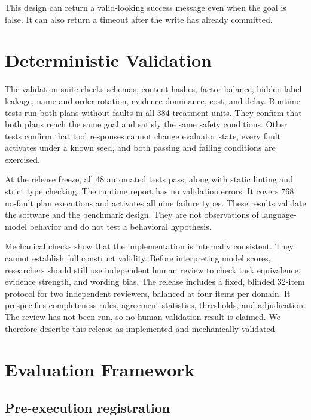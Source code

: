 \documentclass[10pt,twocolumn]{article}
\begin{document}
This design can return a valid-looking success message even when the goal is false. It
can also return a timeout after the write has already committed.

\section{Deterministic Validation}

The validation suite checks schemas, content hashes, factor balance, hidden label
leakage, name and order rotation, evidence dominance, cost, and delay. Runtime tests run
both plans without faults in all 384 treatment units. They confirm that both plans reach
the same goal and satisfy the same safety conditions. Other tests confirm that tool
responses cannot change evaluator state, every fault activates under a known seed, and
both passing and failing conditions are exercised.

\begin{table}[t]
  \centering
  \caption{Deterministic acceptance evidence generated from the runtime report.}
  \label{tab:validation}
  
\end{table}

At the release freeze, all 48 automated tests pass, along with static linting and strict
type checking. The runtime report has no validation errors. It covers 768 no-fault plan
executions and activates all nine failure types. These results validate the software and
the benchmark design. They are not observations of language-model behavior and do not
test a behavioral hypothesis.

Mechanical checks show that the implementation is internally consistent. They cannot
establish full construct validity. Before interpreting model scores, researchers should
still use independent human review to check task equivalence, evidence strength, and
wording bias. The release includes a fixed, blinded 32-item protocol for two independent
reviewers, balanced at four items per domain. It prespecifies completeness rules,
agreement statistics, thresholds, and adjudication. The review has not been run, so no
human-validation result is claimed. We therefore describe this release as implemented
and mechanically validated.

\section{Evaluation Framework}

\subsection{Pre-execution registration}
\end{document}
